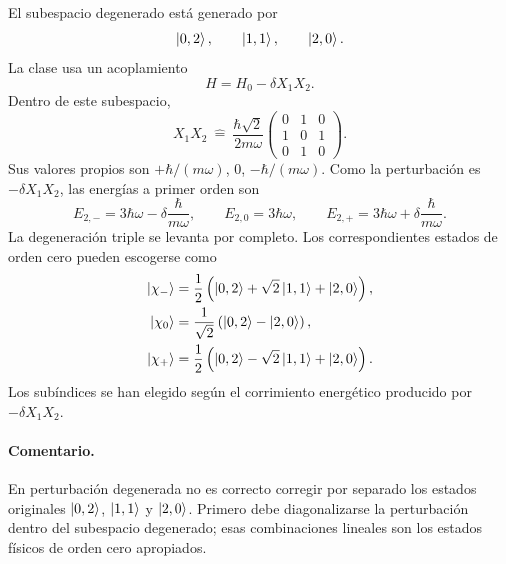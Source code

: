 \documentclass[11pt,a4paper]{article}
\numberwithin{equation}{section}
\renewcommand{\boxed}[1]{#1}
\newcommand{\hb}{\hbar}
\begin{document}
El subespacio degenerado está generado por
\begin{equation}
\ket{0,2},\qquad \ket{1,1},\qquad \ket{2,0}.
\end{equation}
La clase usa un acoplamiento
\begin{equation}
H=H_0-\delta X_1X_2.
\end{equation}
Dentro de este subespacio,
\begin{equation}
X_1X_2\ \widehat{=}\ \frac{\hb\sqrt2}{2m\omega}
\begin{pmatrix}
0&1&0\\1&0&1\\0&1&0
\end{pmatrix}.
\end{equation}
Sus valores propios son $+\hb/(m\omega)$, $0$, $-\hb/(m\omega)$. Como la perturbación es $-\delta X_1X_2$, las energías a primer orden son
\begin{equation}
\boxed{E_{2,-}=3\hb\omega-\delta\frac{\hb}{m\omega},\qquad
E_{2,0}=3\hb\omega,\qquad
E_{2,+}=3\hb\omega+\delta\frac{\hb}{m\omega}.}
\end{equation}
La degeneración triple se levanta por completo. Los correspondientes estados de orden cero pueden escogerse como
\begin{align}
\ket{\chi_-}&=\frac12\left(\ket{0,2}+\sqrt2\ket{1,1}+\ket{2,0}\right),\\
\ket{\chi_0}&=\frac1{\sqrt2}\left(\ket{0,2}-\ket{2,0}\right),\\
\ket{\chi_+}&=\frac12\left(\ket{0,2}-\sqrt2\ket{1,1}+\ket{2,0}\right).
\end{align}
Los subíndices se han elegido según el corrimiento energético producido por $-\delta X_1X_2$.

\paragraph{Comentario.}
En perturbación degenerada no es correcto corregir por separado los estados originales $\ket{0,2}$, $\ket{1,1}$ y $\ket{2,0}$. Primero debe diagonalizarse la perturbación dentro del subespacio degenerado; esas combinaciones lineales son los estados físicos de orden cero apropiados.
\end{document}
